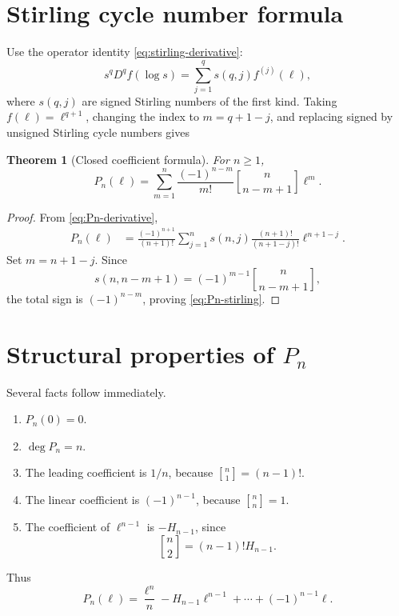 \documentclass[11pt,openany]{book}
\theoremstyle{definition}
\theoremstyle{plain}
\newtheorem{theorem}{Theorem}[chapter]
\theoremstyle{remark}
\newcommand{\stirlingone}[2]{\genfrac{[}{]}{0pt}{}{#1}{#2}}
\DeclareMathOperator{\polydeg}{deg}
\begin{document}
\section{Stirling cycle number formula}
Use the operator identity \cref{eq:stirling-derivative}:
\[
 s^qD^q f(\log s)=\sum_{j=1}^q s(q,j)f^{(j)}(\ell),
\]
where \(s(q,j)\) are signed Stirling numbers of the first kind. Taking \(f(\ell)=\ell^{q+1}\), changing the index to \(m=q+1-j\), and replacing signed by unsigned Stirling cycle numbers gives
\begin{theorem}[Closed coefficient formula]\label{thm:Pn-stirling}
For \(n\ge1\),
\begin{equation}\label{eq:Pn-stirling}
 P_n(\ell)=
 \sum_{m=1}^{n}
 \frac{(-1)^{n-m}}{m!}
 \stirlingone{n}{n-m+1}\ell^m.
\end{equation}
\end{theorem}

\begin{proof}
From \cref{eq:Pn-derivative},
\begin{align*}
 P_n(\ell)
 &=\frac{(-1)^{n+1}}{(n+1)!}
 \sum_{j=1}^n s(n,j)
 \frac{(n+1)!}{(n+1-j)!}\ell^{n+1-j}.
\end{align*}
Set \(m=n+1-j\). Since
\[
 s(n,n-m+1)=(-1)^{m-1}\stirlingone{n}{n-m+1},
\]
the total sign is \((-1)^{n-m}\), proving \cref{eq:Pn-stirling}.
\end{proof}

\section{Structural properties of \texorpdfstring{\(P_n\)}{Pn}}
Several facts follow immediately.
\begin{enumerate}
\item \(P_n(0)=0\).
\item \(\polydeg P_n=n\).
\item The leading coefficient is \(1/n\), because \(\stirlingone{n}{1}=(n-1)!\).
\item The linear coefficient is \((-1)^{n-1}\), because \(\stirlingone{n}{n}=1\).
\item The coefficient of \(\ell^{n-1}\) is \(-H_{n-1}\), since
\[
 \stirlingone{n}{2}=(n-1)!H_{n-1}.
\]
\end{enumerate}
Thus
\begin{equation}\label{eq:Pn-edge-coefficients}
 P_n(\ell)=\frac{\ell^n}{n}-H_{n-1}\ell^{n-1}
 +\cdots+(-1)^{n-1}\ell.
\end{equation}
\end{document}
